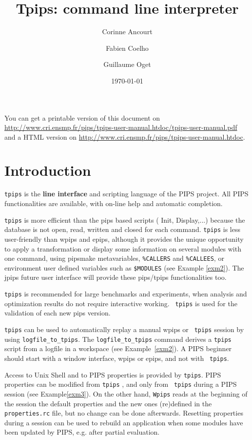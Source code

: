\documentclass[a4paper,12pt]{article}
\title{Tpips: command line interpreter}
\author{Corinne Ancourt \and Fabien Coelho \and Guillaume Oget}
\date{\today}
\newcommand{\PipsTpipsPDF}{\url{http://www.cri.ensmp.fr/pips/tpips-user-manual.htdoc/tpips-user-manual.pdf}\xspace}
\newcommand{\PipsTpipsHTDOC}{\url{http://www.cri.ensmp.fr/pips/tpips-user-manual.htdoc}\xspace}
\begin{document}
\setlength{\parindent}{0in}

\maketitle

You can get a printable version of this document on\\
\PipsTpipsPDF and a HTML version on \PipsTpipsHTDOC.


\tableofcontents

\section{Introduction}


{\tt tpips} is the {\bf line interface} and scripting language of the
PIPS project. All PIPS functionalities are available, with
on-line help and automatic completion.

{\tt tpips} is more efficient than the pips based scripts ( Init,
Display,...) because the database is not open, read, written and closed
for each command. {\tt tpips} is less user-friendly than wpips and epips,
although it provides the unique opportunity to apply a transformation or
display some information on several modules with one command, using
pipsmake metavariables, 
\verb+%CALLERS+ and  \verb+%CALLEES+,  
or environment  user defined variables such
as \verb+$MODULES+ %
(see Example \ref{exm2}). The jpips future user
interface will provide these pips/tpips functionalities too.

{\tt tpips} is recommended for large benchmarks and experiments, when
analysis and optimization results do not require interactive working. {\tt
  tpips} is used for the validation of each new pips version.

{\tt tpips} can be used to automatically replay a manual wpips or {\tt
  tpips} session by using \verb+logfile_to_tpips+. The
\verb+logfile_to_tpips+ command derives a {\tt tpips} script
from a logfile in a workspace (see Example~\ref{exm2}). A PIPS beginner
should start with a window interface, wpips or epips, and not with {\tt
  tpips}.


Access to Unix Shell and to PIPS properties is provided by {\tt tpips}.
PIPS properties can be modified from {\tt tpips} , and only from {\tt
  tpips} during a PIPS session (see Example\ref{exm3}). On the other hand,
{\tt Wpips} reads at the
beginning of the session the default properties and the new ones
(re)defined in the {\tt properties.rc} file, but no change can be done
afterwards.  Resetting properties during a session can be used to rebuild
an application when some modules have been updated by PIPS, e.g. after
partial evaluation.
\end{document}
